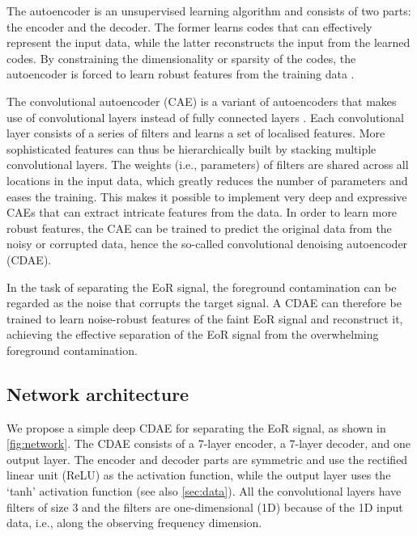 \documentclass[letters,a4paper,fleqn,usenatbib]{mnras}
\begin{document}
The autoencoder is an unsupervised learning algorithm and consists of
two parts: the encoder and the decoder.
The former learns codes that can effectively represent the input data,
while the latter reconstructs the input from the learned codes.
By constraining the dimensionality or sparsity of the codes, the
autoencoder is forced to learn robust features from the training data
\citep[chapter 14]{goodfellow2016}.

The convolutional autoencoder (CAE) is a variant of autoencoders that
makes use of convolutional layers instead of fully connected layers
\citep{masci2011}.
Each convolutional layer consists of a series of filters and learns
a set of localised features.
More sophisticated features can thus be hierarchically built by stacking
multiple convolutional layers.
The weights (i.e., parameters) of filters are shared across all
locations in the input data, which greatly reduces the number of
parameters and eases the training.
This makes it possible to implement very deep and expressive CAEs that
can extract intricate features from the data.
In order to learn more robust features, the CAE can be trained to
predict the original data from the noisy or corrupted data, hence the
so-called convolutional denoising autoencoder (CDAE).

In the task of separating the EoR signal, the foreground contamination
can be regarded as the noise that corrupts the target signal.
A CDAE can therefore be trained to learn noise-robust features of the
faint EoR signal and reconstruct it, achieving the effective separation
of the EoR signal from the overwhelming foreground contamination.


\subsection{Network architecture}
\label{sec:architecture}

We propose a simple deep CDAE for separating the EoR signal, as shown
in \autoref{fig:network}.
The CDAE consists of a 7-layer encoder, a 7-layer decoder,
and one output layer.
The encoder and decoder parts are symmetric and use the rectified
linear unit (ReLU) as the activation function, while the output layer
uses the `tanh' activation function (see also \autoref{sec:data}).
All the convolutional layers have filters of size 3 and the filters
are one-dimensional (1D) because of the 1D input data, i.e., along the
observing frequency dimension.
\end{document}
